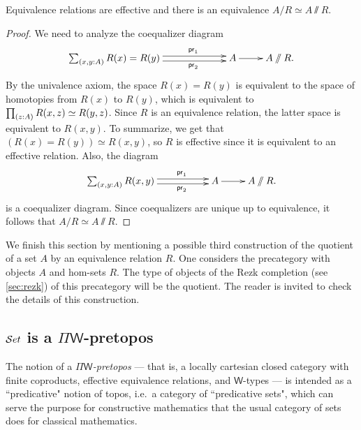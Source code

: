 \begin{thm}
Equivalence relations are effective and there is an equivalence $A/R \simeq A\sslash  R $. 
\end{thm}

\begin{proof}
We need to analyze the coequalizer diagram
\begin{equation*}
  \xymatrix{
    **[l]{\sm{x,y:A} R (x)= R (y)}
    \ar@<0.25em>[r]^{\proj1}
    \ar@<-0.25em>[r]_{\proj2}
    &
    {A}
    \ar[r]
    &
    {A \sslash R.}
  }
\end{equation*}
By the univalence axiom, the space $R (x)= R (y)$ is equivalent to the space of homotopies from $R (x)$ to $R (y)$, which is
equivalent to $\prd{z:A} R (x,z)\simeq R (y,z)$. Since $R $ is an equivalence relation, the latter space is equivalent to $R (x,y)$. To
summarize, we get that $(R (x)= R (y))\simeq R (x,y)$, so $R $ is effective since it is equivalent to an effective relation. Also,
the diagram
\begin{equation*}
  \xymatrix{
    **[l]{\sm{x,y:A} R(x, y)}
    \ar@<0.25em>[r]^{\proj1}
    \ar@<-0.25em>[r]_{\proj2}
    &
    {A}
    \ar[r]
    &
    {A \sslash R.}
  }
\end{equation*}
is a coequalizer diagram. Since coequalizers are unique up to equivalence, it follows that $A/R \simeq A\sslash  R $.
\end{proof}

We finish this section by mentioning a possible third construction of the quotient of a set $A$ by an equivalence relation $R$. One
considers the precategory with objects $A$ and hom-sets $R$. The type of objects of the Rezk completion (see \autoref{sec:rezk}) of this precategory will be the
quotient. The reader is invited to check the details of this construction.

\subsection{\texorpdfstring{$\mathcal{S}et$}{Set} is a \texorpdfstring{$\Pi\mathsf{W}$}{ΠW}-pretopos}
\label{subsec:piw}

The notion of a \emph{$\Pi\mathsf{W}$-pretopos} --- that is, a locally cartesian closed category with finite coproducts, effective equivalence relations, and $\mathsf{W}$-types --- is intended as a ``predicative" notion of topos, i.e.\ a category of ``predicative sets", which can serve the purpose for constructive mathematics that the usual category of sets does for classical mathematics.  

